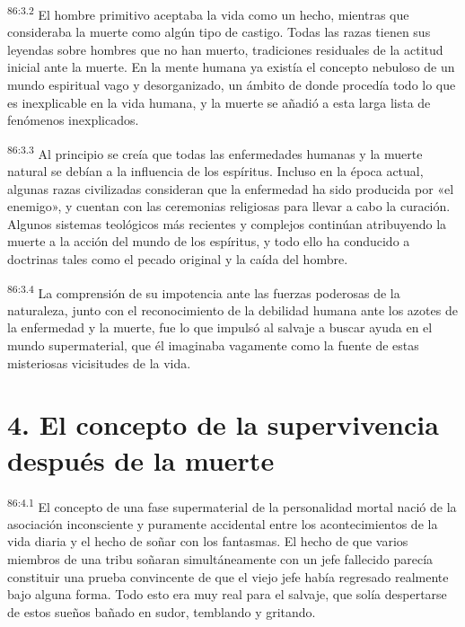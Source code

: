 \par
\textsuperscript{86:3.2} El hombre primitivo aceptaba la vida como un hecho, mientras que consideraba la muerte como algún tipo de castigo. Todas las razas tienen sus leyendas sobre hombres que no han muerto, tradiciones residuales de la actitud inicial ante la muerte. En la mente humana ya existía el concepto nebuloso de un mundo espiritual vago y desorganizado, un ámbito de donde procedía todo lo que es inexplicable en la vida humana, y la muerte se añadió a esta larga lista de fenómenos inexplicados.

\par
\textsuperscript{86:3.3} Al principio se creía que todas las enfermedades humanas y la muerte natural se debían a la influencia de los espíritus. Incluso en la época actual, algunas razas civilizadas consideran que la enfermedad ha sido producida por «el enemigo», y cuentan con las ceremonias religiosas para llevar a cabo la curación. Algunos sistemas teológicos más recientes y complejos continúan atribuyendo la muerte a la acción del mundo de los espíritus, y todo ello ha conducido a doctrinas tales como el pecado original y la caída del hombre.

\par
\textsuperscript{86:3.4} La comprensión de su impotencia ante las fuerzas poderosas de la naturaleza, junto con el reconocimiento de la debilidad humana ante los azotes de la enfermedad y la muerte, fue lo que impulsó al salvaje a buscar ayuda en el mundo supermaterial, que él imaginaba vagamente como la fuente de estas misteriosas vicisitudes de la vida.

\section*{4. El concepto de la supervivencia después de la muerte}
\par
\textsuperscript{86:4.1} El concepto de una fase supermaterial de la personalidad mortal nació de la asociación inconsciente y puramente accidental entre los acontecimientos de la vida diaria y el hecho de soñar con los fantasmas. El hecho de que varios miembros de una tribu soñaran simultáneamente con un jefe fallecido parecía constituir una prueba convincente de que el viejo jefe había regresado realmente bajo alguna forma. Todo esto era muy real para el salvaje, que solía despertarse de estos sueños bañado en sudor, temblando y gritando.

